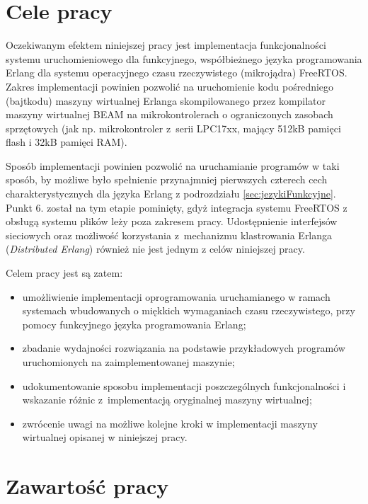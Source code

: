 \section{Cele pracy}
\label{sec:celePracy}

Oczekiwanym efektem niniejszej pracy jest implementacja funkcjonalności systemu uruchomieniowego dla funkcyjnego, współbieżnego języka programowania Erlang dla systemu operacyjnego czasu rzeczywistego (mikrojądra) FreeRTOS.
Zakres implementacji powinien pozwolić na uruchomienie kodu pośredniego (bajtkodu) maszyny wirtualnej Erlanga skompilowanego przez kompilator maszyny wirtualnej BEAM na mikrokontrolerach o ograniczonych zasobach sprzętowych (jak np. mikrokontroler z~serii LPC17xx, mający 512kB pamięci flash i 32kB pamięci RAM).

Sposób implementacji powinien pozwolić na uruchamianie programów w taki sposób, by możliwe było spełnienie przynajmniej pierwszych czterech cech charakterystycznych dla języka Erlang z podrozdziału \ref{sec:jezykiFunkcyjne}. Punkt 6. został na tym etapie pominięty, gdyż integracja systemu FreeRTOS z obsługą systemu plików leży poza zakresem pracy. Udostępnienie interfejsów sieciowych oraz możliwość korzystania z~mechanizmu klastrowania Erlanga (\emph{Distributed Erlang}) również nie jest jednym z celów niniejszej pracy.

Celem pracy jest są zatem:
\begin{itemize}
\item umożliwienie implementacji oprogramowania uruchamianego w ramach systemach wbudowanych o miękkich wymaganiach czasu rzeczywistego, przy pomocy funkcyjnego języka programowania Erlang;
\item zbadanie wydajności rozwiązania na podstawie przykładowych programów uruchomionych na zaimplementowanej maszynie;
\item udokumentowanie sposobu implementacji poszczególnych funkcjonalności i wskazanie różnic z~implementacją oryginalnej maszyny wirtualnej;
\item zwrócenie uwagi na możliwe kolejne kroki w implementacji maszyny wirtualnej opisanej w niniejszej pracy.
\end{itemize}


\section{Zawartość pracy}
\label{sec:zawartoscPracy}

